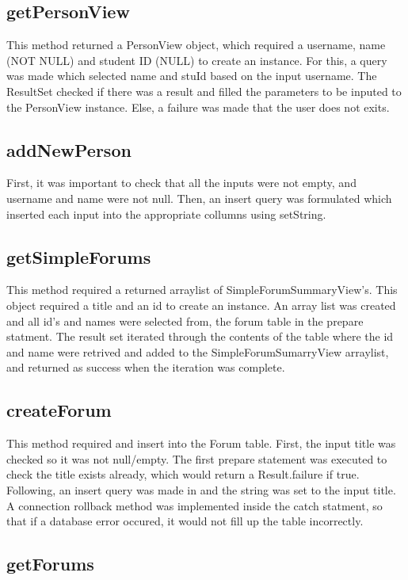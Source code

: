 \documentclass{article}
\begin{document}
\subsection*{getPersonView}

This method returned a PersonView object, which required a username, name (NOT NULL) and student ID (NULL) to create an instance. For this, a query was made which selected name and stuId based on the input username. The ResultSet checked if there was a result and filled the parameters to be inputed to the PersonView instance. Else, a failure was made that the user does not exits.

\subsection*{addNewPerson}

First, it was important to check that all the inputs were not empty, and username and name were not null. Then, an insert query was formulated which inserted each input into the appropriate collumns using setString.

\subsection*{getSimpleForums}

This method required a returned arraylist of SimpleForumSummaryView's. This object required a title and an id to create an instance. An array list was created and all id's and names were selected from, the forum table in the prepare statment. The result set iterated through the contents of the table where the id and name were retrived and added to the SimpleForumSumarryView arraylist, and returned as success when the iteration was complete.


\subsection*{createForum}

This method required and insert into the Forum table. First, the input title was checked so it was not null/empty. The first prepare statement was executed to check the title exists already, which would return a Result.failure if true. Following, an insert query was made in and the string was set to the input title. A connection rollback method was implemented inside the catch statment, so that if a database error occured, it would not fill up the table incorrectly.

\subsection*{getForums}
\end{document}
